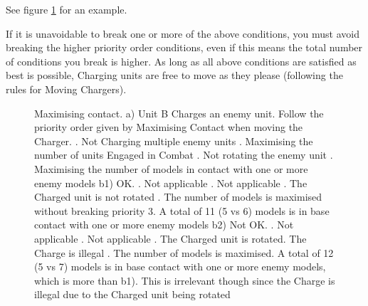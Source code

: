 See figure \ref{figure/maximising_contact} for an example.

If it is unavoidable to break one or more of the above conditions, you must avoid breaking the higher priority order conditions, even if this means the total number of conditions you break is higher. As long as all above conditions are satisfied as best is possible, Charging units are free to move as they please (following the rules for Moving Chargers).

\newcommand{\maxcontactA}{a)}
\newcommand{\maxcontactBOne}{b1)}
\newcommand{\maxcontactBTwo}{b2)}
\newcommand{\maxcontactCharge}{\smallfontsize{\flufffont{Charge!}}}

\begin{figure}[!htbp]
	\renewcommand{\figbiglettersize}{15}
	\centering
	\hypertarget{maximising_contact_figure}{
	\def\svgwidth{\textwidth}
	}
	\caption{Maximising contact.\captionpar
	a) Unit B Charges an enemy unit. Follow the priority order given by Maximising Contact when moving the Charger.\captionlist
	. Not Charging multiple enemy units\newline
	. Maximising the number of units Engaged in Combat\newline
	. Not rotating the enemy unit\newline
	. Maximising the number of models in contact with one or more enemy models
	\captionpar
	b1) OK.\captionlist
	. Not applicable\newline
	. Not applicable\newline
	. The Charged unit is not rotated\newline
	. The number of models is maximised without breaking priority 3. A total of 11 (5 vs 6) models is in base contact with one or more enemy models
	\captionpar
	b2) Not OK.\captionlist
	. Not applicable\newline
	. Not applicable\newline
	. The Charged unit is rotated. The Charge is illegal\newline
	. The number of models is maximised. A total of 12 (5 vs 7) models is in base contact with one or more enemy models, which is more than b1). This is irrelevant though since the Charge is illegal due to the Charged unit being rotated}
	\label{figure/maximising_contact}
\end{figure}

